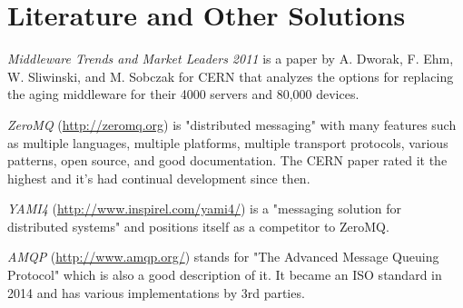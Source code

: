 \documentclass[11pt,journal,compsoc]{IEEEtran}
\begin{document}
\section{Literature and Other Solutions}


\emph{Middleware Trends and Market Leaders 2011}\cite{trends} is a paper by A. Dworak, F. Ehm, W. Sliwinski, and M. Sobczak for CERN that analyzes the options for replacing the aging middleware for their 4000 servers and 80,000 devices. 

\emph{ZeroMQ} (\url{http://zeromq.org}) is "distributed messaging" with many features such as multiple languages, multiple platforms, multiple transport protocols, various patterns, open source, and good documentation. The CERN paper rated it the highest and it's had continual development since then.

\emph{YAMI4} (\url{http://www.inspirel.com/yami4/}) is a "messaging solution for distributed systems" and positions itself as a competitor to ZeroMQ.

\emph{AMQP} (\url{http://www.amqp.org/}) stands for "The Advanced Message Queuing Protocol" which is also a good description of it. It became an ISO standard in 2014 and has various implementations by 3rd parties. 








%
\end{document}
